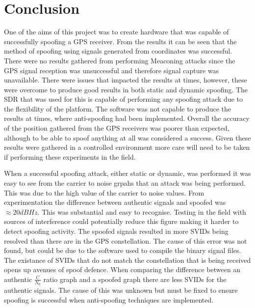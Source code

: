 
\chapter{Conclusion} %

\label{Chapter6} %


One of the aims of this project was to create hardware that was capable of successfully spoofing a GPS receiver. From the results it can be seen that the method of
spoofing using signals generated from coordinates was successful. There were no results gathered from performing Meaconing attacks since the GPS signal reception was
unsuccessful and therefore signal capture was unavailable. There were issues that impacted the results at times, however, these were overcome to produce good results in
both static and dynamic spoofing. The SDR that was used for this is capable of performing any spoofing attack due to the flexibility of the platform. The software was not
capable to produce the results at times, where anti-spoofing had been implemented. Overall the accuracy of the position gathered from the GPS receivers was poorer than expected,
although to be able to spoof anything at all was considered a success. Given these results were gathered in a controlled environment more care will need to be taken if
performing these experiments in the field. 

\bigskip

When a successful spoofing attack, either static or dynamic, was performed it was easy to see from the carrier to noise grpahs that an attack was being performed. This
was due to the high value of the carrier to noise values. From experimentation the difference between authentic signals and spoofed was $\approx 20dBHz$. This was
substantial and easy to recognise. Testing in the field with sources of interference could potentially reduce this figure making it harder to detect spoofing activity.
The spoofed signals resulted in more SVIDs being resolved than there are in the GPS constellation. The cause of this error was not found, but could be due to the software
used to compile the binary signal files. The existance of SVIDs that do not match the constellation that is being received opens up avenues of spoof defence. 
When comparing the difference between an authentic $\frac{C}{N_0}$
ratio graph and a spoofed graph there are less SVIDs for the authentic signals. The cause of this was unknown but must be fixed to ensure spoofing is successful when
anti-spoofing techniques are implemented.  

